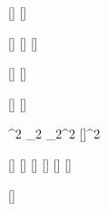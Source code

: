 

\varDef{\angleTwo}{\beta}
\varDef{\angleOne}{\alpha}
\varDef{\angleFour}{\Pi}
\varDef{\angleThree}{\Gamma}

[\mathbb]
[\mathbb]

[\mathcal]
[\mathcal]
[\mathbb]

[\mathcal]
[\mathcal]

[\vectorFmt]
[\unitVecFmt]

^{2}
_{2}
_{2}^{2}
[\vectorFmt]^{2}

[\hat]
[\hat]
[\hat]
[\hat]
[\hat]
[\hat]

\varDef{\thetadot}{\theta}[\dot]